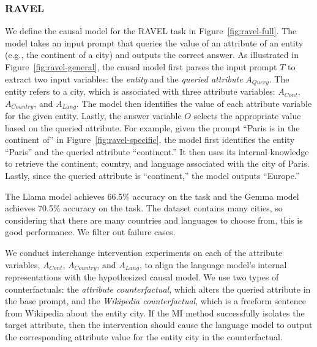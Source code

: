 \documentclass{article}
\theoremstyle{plain}
\theoremstyle{definition}
\theoremstyle{remark}
\newcommand{\continent}{$A_{\mathit{Cont}}$}
\newcommand{\country}{$A_{\mathit{Country}}$}
\newcommand{\lang}{$A_{\mathit{Lang}}$}
\newcommand{\queryvar}{A_{\mathit{Query}}}
\newcommand{\inputvar}{T}
\newcommand{\outputvar}{O}
\begin{document}
\subsubsection{RAVEL}\label{app:causalvariableRAVELdetails}
We define the causal model for the RAVEL task in Figure~\ref{fig:ravel-full}. The model takes an input prompt that queries the value of an attribute of an entity (e.g., the continent of a city) and outputs the correct answer. As illustrated in Figure~\ref{fig:ravel-general}, the causal model first parses the input prompt $\inputvar$ to extract two input variables: the \textit{entity} and the \textit{queried attribute} $\queryvar$. The entity refers to a city, which is associated with three attribute variables: \continent, \country, and \lang. The model then identifies the value of each attribute variable for the given entity. Lastly, the answer variable $\outputvar$ selects the appropriate value based on the queried attribute.
For example, given the prompt ``Paris is in the continent of'' in Figure~\ref{fig:ravel-specific}, the model first identifies the entity ``Paris'' and the queried attribute ``continent.'' It then uses its internal knowledge to retrieve the continent, country, and language associated with the city of Paris. Lastly, since the queried attribute is ``continent,'' the model outputs ``Europe.''

The Llama model achieves 66.5\% accuracy on the task and the Gemma model achieves 70.5\% accuracy on the task. The dataset contains many cities, so considering that there are many countries and languages to choose from, this is good performance. We filter out failure cases.

We conduct interchange intervention experiments on each of the attribute variables, \continent, \country, and \lang, to align the language model's internal representations with the hypothesized causal model. We use two types of counterfactuals: the \textit{attribute counterfactual}, which alters the queried attribute in the base prompt, and the \textit{Wikipedia counterfactual}, which is a freeform sentence from Wikipedia about the entity city. If the MI method successfully isolates the target attribute, then the intervention should cause the language model to output the corresponding attribute value for the entity city in the counterfactual.
\end{document}
